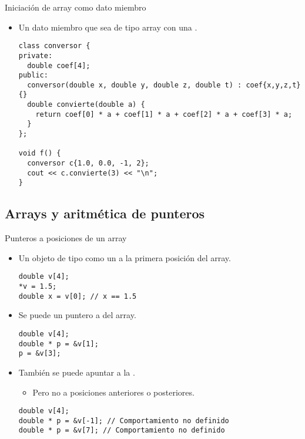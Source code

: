 \begin{frame}[t,fragile]{Iniciación de array como dato miembro}
\begin{itemize}
  \item Un dato miembro que sea de tipo array  
        con una .
\begin{lstlisting}
class conversor {
private:
  double coef[4];
public:
  conversor(double x, double y, double z, double t) : coef{x,y,z,t} {}
  double convierte(double a) {
    return coef[0] * a + coef[1] * a + coef[2] * a + coef[3] * a;
  }
};

void f() {
  conversor c{1.0, 0.0, -1, 2};
  cout << c.convierte(3) << "\n";
}
\end{lstlisting}
\end{itemize}
\end{frame}

\subsection{Arrays y aritmética de punteros}

\begin{frame}[t,fragile]{Punteros a posiciones de un array}
\begin{itemize}
  \item Un objeto de tipo   
        como un  a la primera posición del array.
\begin{lstlisting}
double v[4];
*v = 1.5;
double x = v[0]; // x == 1.5
\end{lstlisting}

  \item Se puede  un puntero a  del array.
\begin{lstlisting}
double v[4];
double * p = &v[1];
p = &v[3];
\end{lstlisting}

  \item También se puede apuntar a la .
    \begin{itemize}
      \item Pero no a posiciones anteriores o posteriores.
    \end{itemize}
\begin{lstlisting}
double v[4];
double * p = &v[-1]; // Comportamiento no definido
double * p = &v[7]; // Comportamiento no definido
\end{lstlisting}
\end{itemize}
\end{frame}


